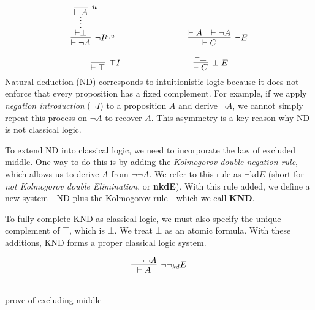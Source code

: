\documentclass{article}
\begin{document}
\[
\infer[\neg I^{p,u}]{\vdash \neg A}{
  \infer*{\vdash \perp}{\infer[u]{\vdash A}{}}
}
\hspace{3cm}
\infer[\neg E]{\vdash C}{
  \vdash A & \vdash \neg A
}
\]

\[
\infer[\top I]{\vdash \top}{}
\hspace{3cm}
\infer[\perp E]{\vdash C}{\vdash \perp}
\]
Natural deduction (ND) corresponds to intuitionistic logic because it does not enforce that every proposition has a fixed complement. For example, if we apply \emph{negation introduction} ($\neg I$) to a proposition $A$ and derive $\neg A$, we cannot simply repeat this process on $\neg A$ to recover $A$. This asymmetry is a key reason why ND is not classical logic.

To extend ND into classical logic, we need to incorporate the law of excluded middle. One way to do this is by adding the \emph{Kolmogorov double negation rule}, which allows us to derive $A$ from $\neg\neg A$. We refer to this rule as $\neg\text{kd}E$ (short for \emph{not Kolmogorov double Elimination}, or \textbf{nkdE}). With this rule added, we define a new system—ND plus the Kolmogorov rule—which we call \textbf{KND}.

To fully complete KND as classical logic, we must also specify the unique complement of $\top$, which is $\bot$. We treat $\bot$ as an atomic formula. With these additions, KND forms a proper classical logic system.

\[
\infer[\neg\neg_{kd}E]{\vdash A}{\vdash \neg\neg A}
\]

\begin{center}
\\
\vspace{1em}
prove of excluding middle

\end{center}
\end{document}
